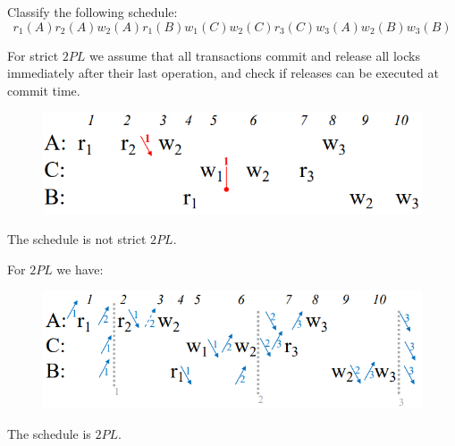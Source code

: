 \documentclass[12pt, a4paper]{report}
\newtheorem[style=M,bodystyle=\normalfont]{theorem}{Theorem}
\newtheorem[style=M,bodystyle=\normalfont]{corollary}{Corollary}
\newtheorem[style=M,bodystyle=\normalfont]{lemma}{Lemma}
\newtheorem[style=M,bodystyle=\normalfont]{definition}{Definition}
\begin{document}
    \newpage

    \begin{Exercise}[label=1]
        Classify the following schedule: 
        \[r_1(A) r_2(A) w_2(A) r_1(B) w_1(C) w_2(C) r_3(C) w_3(A) w_2(B) w_3(B)\]
    \end{Exercise}
    \begin{Answer}[ref=1]
        For strict $2PL$ we assume that all transactions commit and release all locks immediately after their last operation, and check if releases can be executed at commit time.
        \begin{figure}[H]
            \centering
            \includegraphics[width=1\linewidth]{images/2PL5.png}
        \end{figure}
        The schedule is not strict $2PL$.

        For $2PL$ we have: 
        \begin{figure}[H]
            \centering
            \includegraphics[width=1\linewidth]{images/2PL6.png}
        \end{figure}
        The schedule is $2PL$. 
    \end{Answer}

    \newpage
\end{document}
